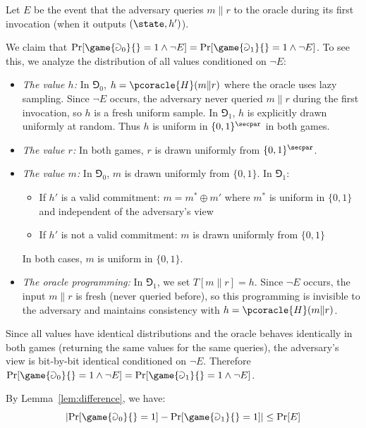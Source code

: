\ifsolutions
\begin{mysolution}
    Let $E$ be the event that the adversary queries $m \| r$ to the oracle during its first invocation (when it outputs $(\state, h')$).
  
  We claim that $\Pr[\game{\Game_0}{} = 1 \wedge \neg E] = \Pr[\game{\Game_1}{} = 1 \wedge \neg E]$. To see this, we analyze the distribution of all values conditioned on $\neg E$:
  
  \begin{itemize}
    \item \emph{The value $h$:} In $\Game_0$, $h = \pcoracle{H}(m \| r)$ where the oracle uses lazy sampling. Since $\neg E$ occurs, the adversary never queried $m \| r$ during the first invocation, so $h$ is a fresh uniform sample. In $\Game_1$, $h$ is explicitly drawn uniformly at random. Thus $h$ is uniform in $\{0,1\}^\secpar$ in both games.
    
    \item \emph{The value $r$:} In both games, $r$ is drawn uniformly from $\{0,1\}^\secpar$.
    
    \item \emph{The value $m$:} In $\Game_0$, $m$ is drawn uniformly from $\{0,1\}$. In $\Game_1$:
      \begin{itemize}
        \item If $h'$ is a valid commitment: $m = m^* \oplus m'$ where $m^*$ is uniform in $\{0,1\}$ and independent of the adversary's view
        \item If $h'$ is not a valid commitment: $m$ is drawn uniformly from $\{0,1\}$
      \end{itemize}
      In both cases, $m$ is uniform in $\{0,1\}$.
    
    \item \emph{The oracle programming:} In $\Game_1$, we set $T[m \| r] = h$. Since $\neg E$ occurs, the input $m \| r$ is fresh (never queried before), so this programming is invisible to the adversary and maintains consistency with $h = \pcoracle{H}(m \| r)$.
  \end{itemize}
  
  Since all values have identical distributions and the oracle behaves identically in both games (returning the same values for the same queries), the adversary's view is bit-by-bit identical conditioned on $\neg E$. Therefore $\Pr[\game{\Game_0}{} = 1 \wedge \neg E] = \Pr[\game{\Game_1}{} = 1 \wedge \neg E]$.
  
  By Lemma~\ref{lem:difference}, we have:
  \[
  \left|\Pr[\game{\Game_0}{} = 1] - \Pr[\game{\Game_1}{} = 1]\right| \leq \Pr[E]
  \]
  

\end{mysolution}
